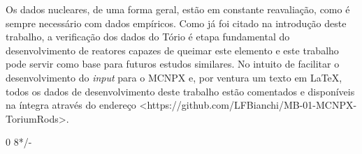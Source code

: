 \documentclass[
	12pt,				%
	openany,			%
	twoside,			%
	a4paper,			%
	english,			%
	french,				%
	spanish,			%
	brazil				%
	]{abntex2}
\begin{document}
Os dados nucleares, de uma forma geral, estão em constante reavaliação, como é sempre necessário com dados empíricos. Como já foi citado na introdução deste trabalho, a verificação dos dados do Tório é etapa fundamental do desenvolvimento de reatores capazes de queimar este elemento e este trabalho pode servir como base para futuros estudos similares. No intuito de facilitar o desenvolvimento do \emph{input} para o MCNPX e, por ventura um texto em LaTeX, todos os dados de desenvolvimento deste trabalho estão comentados e disponíveis na íntegra através do endereço <https://github.com/LFBianchi/MB-01-MCNPX-ToriumRods>.

\postextual



%
%
0
8*/-
\end{document}
